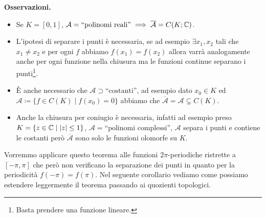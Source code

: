 \textbf{Osservazioni.}
\begin{itemize}
	\item Se $K = [0, 1]$, $\mathcal A = \text{``polinomi reali''} \implies \overline{\mathcal A} = C(K; \mathbb C)$.
	
	\item L'ipotesi di separare i punti è necessaria, se ad esempio $\exists x_1, x_2$ tali che $x_1 \neq x_2$ e per ogni $f$ abbiamo $f(x_1) = f(x_2)$ allora varrà analogamente anche per ogni funzione nella chiusura ma le funzioni continue separano i punti\footnote{Basta prendere una funzione lineare.}.

	\item È anche necessario che $\mathcal A \supset \text{``costanti''}$, ad esempio dato $x_0 \in K$ ed $\mathcal A \coloneqq \{ f \in C(K) \mid f(x_0) = 0 \}$ abbiamo che $\overline{\mathcal A} = \mathcal A \subsetneq C(K)$.

	\item Anche la chiusura per coniugio è necessaria, infatti ad esempio preso $K = \{ z \in \mathbb C \mid |z| \leq 1 \}$, $\mathcal A = \text{``polinomi complessi''}$, $\mathcal A$ separa i punti e contiene le costanti però $\overline{\mathcal A}$ sono solo le funzioni olomorfe su $K$.
\end{itemize}

Vorremmo applicare questo teorema alle funzioni $2\pi$-periodiche ristrette a $[-\pi, \pi]$ che però non verificano la separazione dei punti in quanto per la periodicità $f(-\pi) = f(\pi)$. Nel seguente corollario vediamo come possiamo estendere leggermente il teorema passando ai quozienti topologici.

